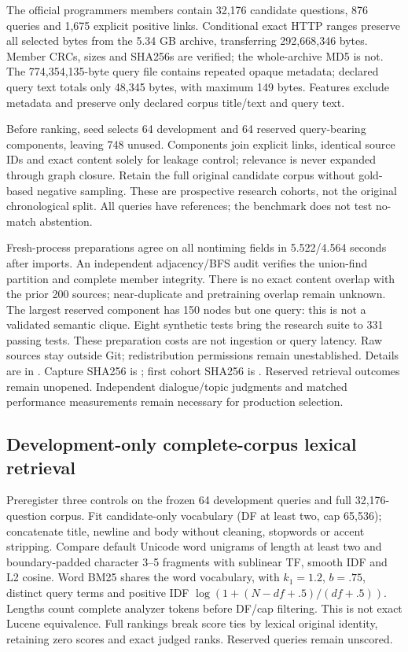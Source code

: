 \documentclass[11pt]{article}
\begin{document}
The official programmers members contain 32,176 candidate questions, 876 queries
and 1,675 explicit positive links. Conditional exact HTTP ranges preserve all
selected bytes from the 5.34 GB archive, transferring 292,668,346 bytes.
Member CRCs, sizes and SHA256s are verified; the whole-archive MD5 is not.
The 774,354,135-byte query file contains repeated opaque metadata; declared
query text totals only 48,345 bytes, with maximum 149 bytes. Features exclude
metadata and preserve only declared corpus title/text and query text.

Before ranking, seed  selects 64
development and 64 reserved query-bearing components, leaving 748 unused.
Components join explicit links, identical source IDs and exact content solely
for leakage control; relevance is never expanded through graph closure.
Retain the full original candidate corpus without gold-based negative sampling.
These are prospective research cohorts, not the original chronological split.
All queries have references; the benchmark does not test no-match abstention.

Fresh-process preparations agree on all nontiming fields in 5.522/4.564 seconds
after imports. An independent adjacency/BFS audit verifies the union-find
partition and complete member integrity. There is no exact content overlap with
the prior 200 sources; near-duplicate and pretraining overlap remain unknown.
The largest reserved component has 150 nodes but one query: this is not a
validated semantic clique. Eight synthetic tests bring the research suite to
331 passing tests. These preparation costs are not ingestion or query latency.
Raw sources stay outside Git; redistribution permissions remain unestablished.
Details are in .
Capture SHA256 is
;
first cohort SHA256 is
.
Reserved retrieval outcomes remain unopened. Independent dialogue/topic judgments
and matched performance measurements remain necessary for production selection.

\subsection{Development-only complete-corpus lexical retrieval}
Preregister three controls on the frozen 64 development queries and full
32,176-question corpus. Fit candidate-only vocabulary (DF at least two,
cap 65,536); concatenate title, newline and body without cleaning, stopwords
or accent stripping. Compare default Unicode word unigrams of length at least
two and boundary-padded character 3--5 fragments with sublinear TF, smooth
IDF and L2 cosine\cite{sklearntfidf}. Word BM25\cite{bm25review2009} shares
the word vocabulary, with $k_1=1.2$, $b=.75$, distinct query terms and positive
IDF $\log(1+(N-df+.5)/(df+.5))$\cite{lucenebm25}. Lengths count complete
analyzer tokens before DF/cap filtering. This is not exact Lucene equivalence.
Full rankings break score ties by lexical original identity, retaining zero
scores and exact judged ranks. Reserved queries remain unscored.
\end{document}
